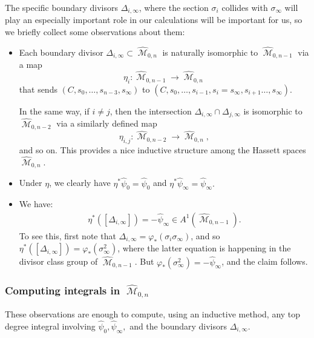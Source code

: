 \documentclass[12pt,reqno]{amsart}
\DeclareMathOperator{\M}{\mathcal{M}}
\renewcommand{\to}{{\longrightarrow}}
\numberwithin{equation}{section}
\newcommand{\hpsi}{\widehat{\psi}}
\newcommand{\hM}{\widehat{\M}}
\begin{document}
The specific boundary divisors $\Delta_{i, \infty}$, where the section
$\sigma_{i}$ collides with $\sigma_{\infty}$ will play an especially
important role in our calculations will be important for us, so we
briefly collect some observations about them:
\begin{itemize}\label{item:boundaryprops}
\item Each boundary divisor $\Delta_{i,\infty} \subset \hM_{0,n}$ is
  naturally isomorphic to $\hM_{0,n-1}$ via a map
  $$\eta_{i}: \hM_{0,n-1} \to \hM_{0,n}$$ that sends
  $(C, s_{0}, \dots, s_{n-3}, s_{\infty})$ to
  $(C, s_{0}, \dots, s_{i-1}, s_{i}=s_{\infty}, s_{i+1} \dots,
  s_{\infty})$.

  In the same way, if $i \neq j$, then the intersection
  $\Delta_{i,\infty} \cap \Delta_{j, \infty}$ is isomorphic to
  $\hM_{0,n-2}$ via a similarly defined map
  $$\eta_{i,j}: \hM_{0,n-2} \to \hM_{0,n},$$ and so on.  This provides a
  nice inductive structure among the Hassett spaces $\hM_{0,n}$.
  
\item Under $\eta$, we clearly have $\eta^{*}\hpsi_{0} = \hpsi_{0}$
  and $\eta^{*}\hpsi_{\infty} = \hpsi_{\infty}.$
\item We have:
\begin{align}\label{eq:pullbackdelta}
  \eta^{*}([\Delta_{i,\infty}]) = -\hpsi_{\infty} \in A^{1}(\hM_{0,n-1}).
\end{align}
To see this, first note that
$\Delta_{i, \infty} = \varphi_{*}(\sigma_{i}\sigma_{\infty})$, and so
$\eta^{*}([\Delta_{i,\infty}]) = \varphi_{*}(\sigma_{\infty}^{2})$,
where the latter equation is happening in the divisor class group of
$\hM_{0,n-1}$.  But
$\varphi_{*}(\sigma_{\infty}^{2}) = - \hpsi_{\infty}$, and the claim
follows.
\end{itemize}


\subsubsection{Computing integrals in $\hM_{0,n}$}

These observations are enough to compute, using an inductive method,
any top degree integral involving $\hpsi_{0}, \hpsi_{\infty},$ and the
boundary divisors $\Delta_{i, \infty}$.
\end{document}

